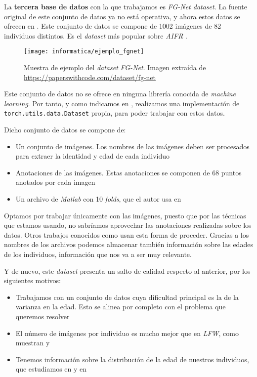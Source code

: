 La \textbf{tercera base de datos} con la que trabajamos es \textit{FG-Net dataset}. La fuente original de este conjunto de datos ya no está operativa, y ahora estos datos se ofrecen en \cite{informatica:fgnet_dataset}. Este conjunto de datos se compone de 1002 imágenes de 82 individuos distintos. Es el \textit{dataset} más popular sobre \textit{AIFR} \cite{informatica:best_fgnet_model}.

\begin{figure}[H]
    \centering
    \texttt{[image: informatica/ejemplo\_fgnet]}
    \caption{Muestra de ejemplo del \textit{dataset} \textit{FG-Net}. Imagen extraída de \url{https://paperswithcode.com/dataset/fg-net}}
\end{figure}

Este conjunto de datos no se ofrece en ninguna librería conocida de \textit{machine learning}. Por tanto, y como indicamos en , realizamos una implementación de \lstinline{torch.utils.data.Dataset} propia, para poder trabajar con estos datos.

Dicho conjunto de datos se compone de:

\begin{itemize}
    \item Un conjunto de imágenes. Los nombres de las imágenes deben ser procesados para extraer la identidad y edad de cada individuo
    \item Anotaciones de las imágenes. Estas anotaciones se componen de 68 puntos anotados por cada imagen
    \item Un archivo de \textit{Matlab} con 10 \textit{folds}, que el autor usa en \cite{informatica:yanweifu_work}
\end{itemize}

Optamos por trabajar únicamente con las imágenes, puesto que por las técnicas que estamos usando, no sabríamos aprovechar las anotaciones realizadas sobre los datos. Otros trabajos conocidos como \cite{informatica:facenet} usan esta forma de proceder. Gracias a los nombres de los archivos podemos almacenar también información sobre las edades de los individuos, información que nos va a ser muy relevante.

Y de nuevo, este \textit{dataset} presenta un salto de calidad respecto al anterior, por los siguientes motivos:

\begin{itemize}
    \item Trabajamos con un conjunto de datos cuya dificultad principal es la de la varianza en la edad. Esto se alinea por completo con el problema que queremos resolver
    \item El número de imágenes por individuo es mucho mejor que en \textit{LFW}, como muestran  y 
    \item Tenemos información sobre la distribución de la edad de nuestros individuos, que estudiamos en  y en 
\end{itemize}

